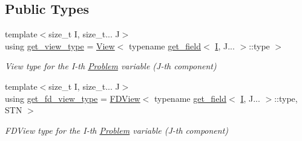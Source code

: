 \subsection*{Public Types}
\begin{DoxyCompactItemize}
\item 
{\footnotesize template$<$size\+\_\+t I, size\+\_\+t... J$>$ }\\using \hyperlink{classUintah_1_1PhaseField_1_1Problem_a53d941e785f501dddb8c369644eae4fa}{get\+\_\+view\+\_\+type} = \hyperlink{namespaceUintah_1_1PhaseField_a59210a1e28eba254d428762c92ddeabb}{View}$<$ typename \hyperlink{structUintah_1_1PhaseField_1_1Problem_1_1get__field}{get\+\_\+field}$<$ \hyperlink{structUintah_1_1PhaseField_1_1I}{I}, J... $>$\+::type $>$
\begin{DoxyCompactList}\small\item\em View type for the I-\/th \hyperlink{classUintah_1_1PhaseField_1_1Problem}{Problem} variable (J-\/th component) \end{DoxyCompactList}\item 
{\footnotesize template$<$size\+\_\+t I, size\+\_\+t... J$>$ }\\using \hyperlink{classUintah_1_1PhaseField_1_1Problem_a89c10e32620acbe3cae959667a1cdd3e}{get\+\_\+fd\+\_\+view\+\_\+type} = \hyperlink{namespaceUintah_1_1PhaseField_a63032464b1cd54eaa53c1c29109746ac}{F\+D\+View}$<$ typename \hyperlink{structUintah_1_1PhaseField_1_1Problem_1_1get__field}{get\+\_\+field}$<$ \hyperlink{structUintah_1_1PhaseField_1_1I}{I}, J... $>$\+::type, S\+TN $>$
\begin{DoxyCompactList}\small\item\em F\+D\+View type for the I-\/th \hyperlink{classUintah_1_1PhaseField_1_1Problem}{Problem} variable (J-\/th component) \end{DoxyCompactList}\end{DoxyCompactItemize}

